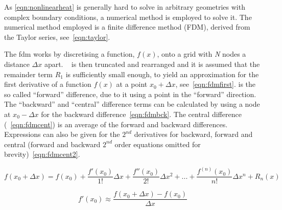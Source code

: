 

	
	
	

As \cref{eqn:nonlinearheat} is generally hard to solve in arbitrary geometries with complex boundary conditions, a numerical method is employed to solve it.
The numerical method employed is a finite difference method (FDM), derived from the Taylor series, see~\cref{eqn:taylor}. 


The \gls*{fdm} works by discretising a function, $f(x)$, onto a grid with \textit{N} nodes a distance $\Delta x$ apart. ~ is then truncated and rearranged and it is assumed that the remainder term $R_1$ is sufficiently small enough, to yield an approximation for the first derivative of a function $f(x)$ at a point $x_0+\Delta x$, see~\cref{eqn:fdmfirst}.
 is the so called ``forward'' difference, due to it using a point in the ``forward'' direction.
The ``backward'' and ``central'' difference terms can be calculated by using a node at $x_0-\Delta x$ for the backward difference~\cref{eqn:fdmbck}.
The central difference (~\cref{eqn:fdmcent}) is an average of the forward and backward differences.
Expressions can also be given for the $2^{nd}$ derivatives for backward, forward and central (forward and backward $2^{nd}$ order equations omitted for brevity)~\cref{eqn:fdmcent2}.

\begin{equation}
f(x_0+\Delta x)=f(x_0) + \frac{f'(x_0)}{1!}\Delta x + \frac{f''(x_0)}{2!}\Delta x^2+...+ \frac{f^{(n)}(x_0)}{n!}\Delta x^n+R_n(x)
\label{eqn:taylor}
\end{equation}

\begin{equation}
f'(x_0) \approx \frac{f(x_0+\Delta x)-f(x_0)}{\Delta x}
\label{eqn:fdmfirst}
\end{equation}


